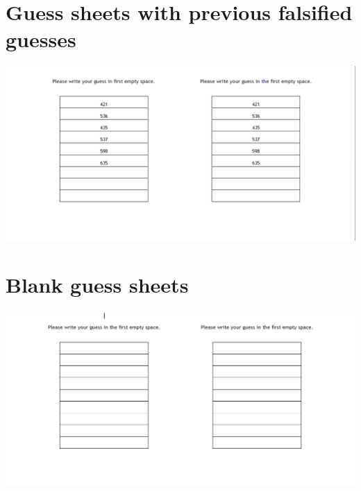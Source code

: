 \documentclass{report}
\begin{document}
\chapter{Guess sheets with previous falsified guesses}
\includegraphics[width=\textwidth]{psych1}
\chapter{Blank guess sheets}
\includegraphics[width=\textwidth]{psych2}
\end{document}
